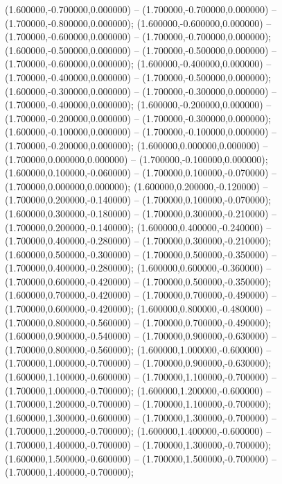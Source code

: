  (1.600000,-0.700000,0.000000) -- (1.700000,-0.700000,0.000000) -- (1.700000,-0.800000,0.000000);
 (1.600000,-0.600000,0.000000) -- (1.700000,-0.600000,0.000000) -- (1.700000,-0.700000,0.000000);
 (1.600000,-0.500000,0.000000) -- (1.700000,-0.500000,0.000000) -- (1.700000,-0.600000,0.000000);
 (1.600000,-0.400000,0.000000) -- (1.700000,-0.400000,0.000000) -- (1.700000,-0.500000,0.000000);
 (1.600000,-0.300000,0.000000) -- (1.700000,-0.300000,0.000000) -- (1.700000,-0.400000,0.000000);
 (1.600000,-0.200000,0.000000) -- (1.700000,-0.200000,0.000000) -- (1.700000,-0.300000,0.000000);
 (1.600000,-0.100000,0.000000) -- (1.700000,-0.100000,0.000000) -- (1.700000,-0.200000,0.000000);
 (1.600000,0.000000,0.000000) -- (1.700000,0.000000,0.000000) -- (1.700000,-0.100000,0.000000);
 (1.600000,0.100000,-0.060000) -- (1.700000,0.100000,-0.070000) -- (1.700000,0.000000,0.000000);
 (1.600000,0.200000,-0.120000) -- (1.700000,0.200000,-0.140000) -- (1.700000,0.100000,-0.070000);
 (1.600000,0.300000,-0.180000) -- (1.700000,0.300000,-0.210000) -- (1.700000,0.200000,-0.140000);
 (1.600000,0.400000,-0.240000) -- (1.700000,0.400000,-0.280000) -- (1.700000,0.300000,-0.210000);
 (1.600000,0.500000,-0.300000) -- (1.700000,0.500000,-0.350000) -- (1.700000,0.400000,-0.280000);
 (1.600000,0.600000,-0.360000) -- (1.700000,0.600000,-0.420000) -- (1.700000,0.500000,-0.350000);
 (1.600000,0.700000,-0.420000) -- (1.700000,0.700000,-0.490000) -- (1.700000,0.600000,-0.420000);
 (1.600000,0.800000,-0.480000) -- (1.700000,0.800000,-0.560000) -- (1.700000,0.700000,-0.490000);
 (1.600000,0.900000,-0.540000) -- (1.700000,0.900000,-0.630000) -- (1.700000,0.800000,-0.560000);
 (1.600000,1.000000,-0.600000) -- (1.700000,1.000000,-0.700000) -- (1.700000,0.900000,-0.630000);
 (1.600000,1.100000,-0.600000) -- (1.700000,1.100000,-0.700000) -- (1.700000,1.000000,-0.700000);
 (1.600000,1.200000,-0.600000) -- (1.700000,1.200000,-0.700000) -- (1.700000,1.100000,-0.700000);
 (1.600000,1.300000,-0.600000) -- (1.700000,1.300000,-0.700000) -- (1.700000,1.200000,-0.700000);
 (1.600000,1.400000,-0.600000) -- (1.700000,1.400000,-0.700000) -- (1.700000,1.300000,-0.700000);
 (1.600000,1.500000,-0.600000) -- (1.700000,1.500000,-0.700000) -- (1.700000,1.400000,-0.700000);

